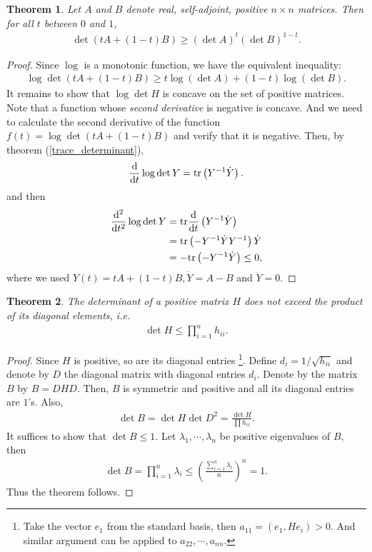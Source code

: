 \documentclass[11pt]{book}
\newtheorem{theorem}{Theorem}[section]
\theoremstyle{definition}
\numberwithin{equation}{subsection}
\begin{document}
\medskip

\begin{theorem}
Let $A$ and $B$ denote real, self-adjoint, positive $n \times n$ matrices. Then for all $t$ between $0$ and $1$,
\begin{align*}
    \det \left(tA + (1-t)B \right) \geq (\det A)^t (\det B)^{1-t}.
\end{align*}
\end{theorem}
\begin{proof}
Since $\log$ is a monotonic function, we have the equivalent inequality:
\begin{align*}
    \log \det \left(tA + (1-t)B \right) \geq t \log (\det A) + (1-t) \log (\det B).
\end{align*}
It remains to show that $\log \det H$ is concave on the set of positive matrices. Note that a function whose {\em second derivative} is negative is concave. And we need to calculate the second derivative of the function $f(t) = \log \det (tA + (1-t)B)$ and verify that it is negative. Then, by theorem (\ref{trace_determinant}),
\begin{align*}
    \dv{}{t} \log \det Y = {\rm tr} \left(Y^{-1} \dot{Y} \right).
\end{align*}
and then
\begin{align*}
    \dv{^2}{t^2} \log \det Y & = {\rm tr} \dv{}{t} \left(Y^{-1} \dot{Y} \right) \\
    & = {\rm tr} \left(- Y^{-1} \dot{Y} Y^{-1} \right) \dot{Y} \\
    & = - {\rm tr} \left(- Y^{-1} \dot{Y} \right) \leq 0,
\end{align*}
where we used $Y(t) = tA + (1-t)B, \dot{Y} = A - B$ and $\ddot{Y} = 0$. 
\end{proof}

\medskip

\begin{theorem}
The determinant of a positive matrix $H$ does not exceed the product of its diagonal elements, i.e.
\begin{align*}
    \det H \leq \prod^n_{i=1} h_{ii}.
\end{align*}
\end{theorem}
\begin{proof}
Since $H$ is positive, so are its diagonal entries \footnote{Take the vector $e_1$ from the standard basis, then $a_{11} = \left(e_1, H e_i\right) > 0$. And similar argument can be applied to $a_{22}, \cdots, a_{nn}$\cite{24}.}. Define $d_i = 1/\sqrt{h_{ii}}$ and denote by $D$ the diagonal matrix with diagonal entries $d_i$. Denote by the matrix $B$ by $B = DHD$. Then, $B$ is symmetric and positive and all its diagonal entries are $1$'s. Also,
\begin{align*}
    \det B = \det H \det D^2 = \frac{\det H}{\prod h_{ii}}.
\end{align*}
It suffices to show that $\det B \leq 1$. Let $\lambda_1, \cdots, \lambda_n$ be positive eigenvalues of $B$, then
\begin{align*}
    \det B = \prod^n_{i=1} \lambda_i \leq \left(\frac{\sum^n_{i=1}\lambda_i}{n}\right)^n = 1.
\end{align*}
Thus the theorem follows.
\end{proof}
\end{document}
